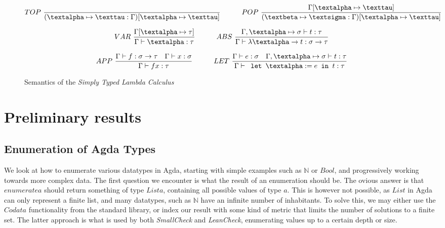 \documentclass[11pt]{article}
\begin{document}
\begin{figure}[h] 
\hrulefill

\begin{equation*}
  TOP\ \frac{}{(\textalpha \mapsto \texttau : \Gamma) [\textalpha \mapsto \texttau]} 
\quad\quad\quad 
  POP\ \frac{\Gamma[\textalpha \mapsto \texttau]}{(\textbeta \mapsto \textsigma : \Gamma) [ \textalpha \mapsto \texttau ] }
\end{equation*}

\begin{equation*}
  VAR\ \frac{\Gamma[\textalpha \mapsto \tau]}{\Gamma \vdash \textalpha : \tau}
\quad\quad\quad
  ABS\ \frac{\Gamma , \textalpha \mapsto \sigma \vdash t : \tau}{\Gamma \vdash \lambda \textalpha \rightarrow t : \sigma \rightarrow \tau}
\end{equation*}

\begin{equation*}
  APP\ \frac{\Gamma \vdash f : \sigma \rightarrow \tau \quad \Gamma \vdash x : \sigma}{\Gamma \vdash f x : \tau}
\quad\quad\quad 
  LET\ \frac{\Gamma \vdash e : \sigma \quad \Gamma , \textalpha \mapsto \sigma \vdash t : \tau}
            {\Gamma \vdash \texttt{ let } \textalpha := e \texttt{ in } t : \tau }
\end{equation*}

\hrulefill
\caption{Semantics of the \textit{Simply Typed Lambda Calculus}}
\end{figure}


\section{Preliminary results}\label{preliminary}

\subsection{Enumeration of Agda Types}

We look at how to enumerate various datatypes in Agda, starting with simple examples such as $\mathbb{N}$ or $Bool$, and progressively working towards more complex data. The first question we encounter is what the result of an enumeration should be. The ovious answer is that $enumerate a$ should return something of type $List a$, containing all possible values of type $a$. This is however not possible, as $List$ in Agda can only represent a finite list, and many datatypes, such as $\mathbb{N}$ have an infinite number of inhabitants. To solve this, we may either use the $Codata$ functionality from the standard library, or index our result with some kind of metric that limits the number of solutions to a finite set. The latter approach is what is used by both \textit{SmallCheck}\cite{} and \textit{LeanCheck}\cite{}, enumerating values up to a certain depth or size. 
\end{document}

